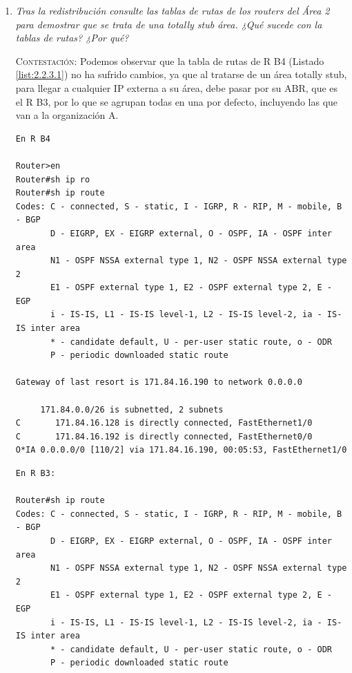 \documentclass[twoside, 11pt]{article}
\begin{document}
\begin{enumerate}
\begin{center}
\begin{verbatim}
Trace complete.
\end{verbatim}
\label{list:2.2.2}
\end{center}

    \item \textit{Tras la redistribución consulte las tablas de rutas de los routers del Área 2 para demostrar que se trata de una totally stub área. ¿Qué sucede con la tablas de rutas? ¿Por qué?}
    \label{ej:2.2.3}

    \vspace{7px}

    \textsc{Contestación}: Podemos observar que la tabla de rutas de R B4 (Listado \ref{list:2.2.3.1}) no ha sufrido cambios, ya que al tratarse de un área totally stub, para llegar a cualquier IP externa a su área, debe pasar por su ABR, que es el R B3, por lo que se agrupan todas en una por defecto, incluyendo las que van a la organización A.

\begin{center}
\begin{verbatim}
En R B4

Router>en
Router#sh ip ro
Router#sh ip route 
Codes: C - connected, S - static, I - IGRP, R - RIP, M - mobile, B - BGP
       D - EIGRP, EX - EIGRP external, O - OSPF, IA - OSPF inter area
       N1 - OSPF NSSA external type 1, N2 - OSPF NSSA external type 2
       E1 - OSPF external type 1, E2 - OSPF external type 2, E - EGP
       i - IS-IS, L1 - IS-IS level-1, L2 - IS-IS level-2, ia - IS-IS inter area
       * - candidate default, U - per-user static route, o - ODR
       P - periodic downloaded static route

Gateway of last resort is 171.84.16.190 to network 0.0.0.0

     171.84.0.0/26 is subnetted, 2 subnets
C       171.84.16.128 is directly connected, FastEthernet1/0
C       171.84.16.192 is directly connected, FastEthernet0/0
O*IA 0.0.0.0/0 [110/2] via 171.84.16.190, 00:05:53, FastEthernet1/0
\end{verbatim}
\label{list:2.2.3.1}
    
\begin{verbatim}
En R B3:

Router#sh ip route
Codes: C - connected, S - static, I - IGRP, R - RIP, M - mobile, B - BGP
       D - EIGRP, EX - EIGRP external, O - OSPF, IA - OSPF inter area
       N1 - OSPF NSSA external type 1, N2 - OSPF NSSA external type 2
       E1 - OSPF external type 1, E2 - OSPF external type 2, E - EGP
       i - IS-IS, L1 - IS-IS level-1, L2 - IS-IS level-2, ia - IS-IS inter area
       * - candidate default, U - per-user static route, o - ODR
       P - periodic downloaded static route


\end{verbatim}
\end{center}
\end{enumerate}
\end{document}
